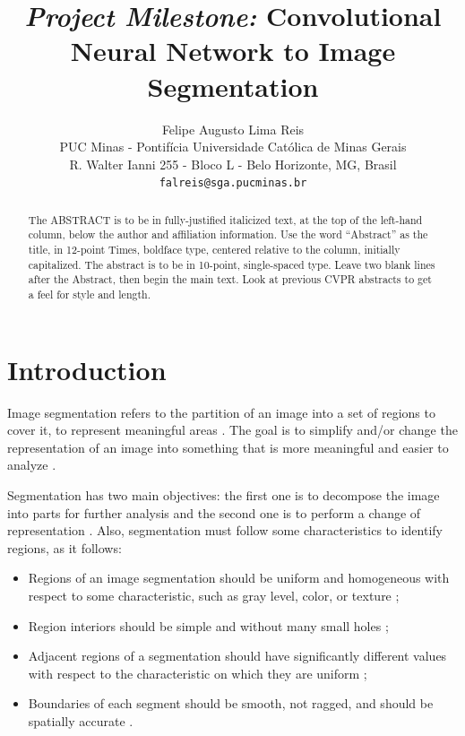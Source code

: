 \documentclass[10pt,twocolumn,letterpaper]{article}
\begin{document}
\title{\textit{Project Milestone:} Convolutional Neural Network to Image Segmentation}

\author{Felipe Augusto Lima Reis\\
PUC Minas - Pontif\'icia Universidade Cat\'olica de Minas Gerais\\
R. Walter Ianni 255 - Bloco L - Belo Horizonte, MG, Brasil\\
{\tt\small falreis@sga.pucminas.br}
}

\maketitle

\begin{abstract}
   The ABSTRACT is to be in fully-justified italicized text, at the top
   of the left-hand column, below the author and affiliation
   information. Use the word ``Abstract'' as the title, in 12-point
   Times, boldface type, centered relative to the column, initially
   capitalized. The abstract is to be in 10-point, single-spaced type.
   Leave two blank lines after the Abstract, then begin the main text.
   Look at previous CVPR abstracts to get a feel for style and length.
\end{abstract}

\section{Introduction} \label{introduction}

Image segmentation refers to the partition of an image into a set of regions to cover it, to represent meaningful areas \cite{DOMINGUEZ}. The goal is to simplify and/or change the representation of an image into something
that is more meaningful and easier to analyze \cite{AHMED_SARMA}.

Segmentation has two main objectives: the first one is to decompose the image into parts for further analysis and the second one is to perform a change of representation \cite{DOMINGUEZ}. Also, segmentation must follow some characteristics to identify regions, as it follows:

\begin{itemize}
 \item Regions of an image segmentation should be uniform and homogeneous with respect to some characteristic, such as gray level, color, or texture \cite{DOMINGUEZ};
 \item Region interiors should be simple and without many small holes \cite{DOMINGUEZ};
 \item Adjacent regions of a segmentation should have significantly different values with respect to the characteristic on which they are uniform \cite{DOMINGUEZ};
 \item Boundaries of each segment should be smooth, not ragged, and should be spatially accurate \cite{DOMINGUEZ}.
\end{itemize}
\end{document}
